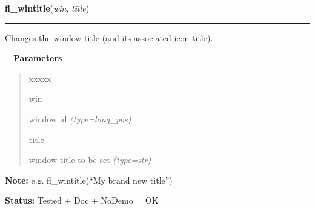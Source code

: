 \hspace{.8\funcindent}\begin{boxedminipage}{\funcwidth}

    \raggedright \textbf{fl\_wintitle}(\textit{win}, \textit{title})

    \vspace{-1.5ex}

    \rule{\textwidth}{0.5\fboxrule}
\setlength{\parskip}{2ex}

Changes the window title (and its associated icon title).

-{}-
\setlength{\parskip}{1ex}
      \textbf{Parameters}
      \vspace{-1ex}

      \begin{quote}
        \begin{Ventry}{xxxxx}

          \item[win]


window id
            {\it (type=long\_pos)}

          \item[title]


window title to be set
            {\it (type=str)}

        \end{Ventry}

      \end{quote}

\textbf{Note:} 
e.g. fl\_wintitle(``My brand new title'')


\textbf{Status:} 
Tested + Doc + NoDemo = OK


    \end{boxedminipage}

    \label{xformslib:flxbasic:fl_winicontitle}

    \vspace{0.5ex}

